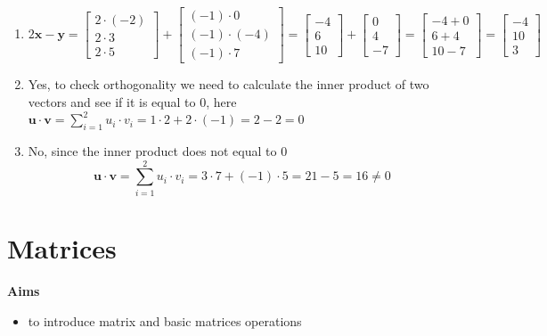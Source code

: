 \documentclass[
]{book}
\providecommand{\tightlist}{%
  \setlength{\itemsep}{0pt}\setlength{\parskip}{0pt}}
\theoremstyle{definition}
\theoremstyle{definition}
\theoremstyle{definition}
\theoremstyle{remark}
\begin{document}
\begin{enumerate}
\def\labelenumi{\alph{enumi})}
\setcounter{enumi}{1}
\item
  \[2\mathbf{x} - \mathbf{y} = \begin{bmatrix} 2 \cdot (-2) \\ 2 \cdot 3 \\ 2 \cdot 5 \end{bmatrix} + \begin{bmatrix} (-1) \cdot 0 \\ (-1) \cdot (-4) \\ (-1) \cdot 7 \end{bmatrix} = \begin{bmatrix} -4 \\ 6 \\ 10 \end{bmatrix}  + \begin{bmatrix} 0 \\ 4 \\ -7 \end{bmatrix}  = \begin{bmatrix} -4 + 0 \\ 6 + 4 \\ 10 - 7 \end{bmatrix} = \begin{bmatrix} -4 \\ 10 \\ 3 \end{bmatrix}\]
\item
  Yes, to check orthogonality we need to calculate the inner product of two vectors and see if it is equal to 0, here
  \(\mathbf{u} \cdot \mathbf{v} =\displaystyle\sum_{i=1}^{2}u_i\cdot v_i = 1 \cdot 2 + 2 \cdot (-1) = 2 - 2 = 0\)
\item
  No, since the inner product does not equal to 0 \[\mathbf{u} \cdot \mathbf{v} =\displaystyle\sum_{i=1}^{2}u_i\cdot v_i = 3 \cdot 7 + (-1) \cdot 5 = 21 - 5 = 16 \neq 0\]
\end{enumerate}

\hypertarget{matrices}{%
\chapter{Matrices}\label{matrices}}

\textbf{Aims}

\begin{itemize}
\tightlist
\item
  to introduce matrix and basic matrices operations
\end{itemize}
\end{document}
